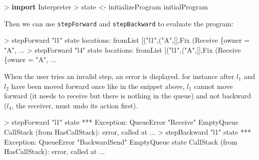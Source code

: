 \documentclass[runningheads,plain]{llncs}
\newenvironment{Shaded}{}{}
\newcommand{\KeywordTok}[1]{\textcolor[rgb]{0.00,0.44,0.13}{\textbf{#1}}}
\newcommand{\DataTypeTok}[1]{\textcolor[rgb]{0.56,0.13,0.00}{#1}}
\newcommand{\StringTok}[1]{\textcolor[rgb]{0.25,0.44,0.63}{#1}}
\newcommand{\OtherTok}[1]{\textcolor[rgb]{0.00,0.44,0.13}{#1}}
\newcommand{\FunctionTok}[1]{\textcolor[rgb]{0.02,0.16,0.49}{#1}}
\newcommand{\NormalTok}[1]{#1}
\begin{document}
\begin{Shaded}
\begin{Highlighting}[]
\FunctionTok{>} \KeywordTok{import }\DataTypeTok{Interpreter}
\FunctionTok{>}\NormalTok{ state }\OtherTok{<-}\NormalTok{ initializeProgram initialProgram}
\end{Highlighting}
\end{Shaded}

Then we can use \texttt{stepForward} and \texttt{stepBackward} to
evaluate the program:

\begin{Shaded}
\begin{Highlighting}[]
\FunctionTok{>}\NormalTok{ stepForward }\StringTok{"l1"}\NormalTok{ state}
\NormalTok{locations}\FunctionTok{:}\NormalTok{ fromList [(}\StringTok{"l1"}\NormalTok{,(}\StringTok{"A"}\NormalTok{,[],}\DataTypeTok{Fix}\NormalTok{ (}\DataTypeTok{Receive}\NormalTok{ \{owner }\FunctionTok{=} \StringTok{"A"}\NormalTok{, }\FunctionTok{...} 
\FunctionTok{>}\NormalTok{ stepForward }\StringTok{"l4"}\NormalTok{ state }
\NormalTok{locations}\FunctionTok{:}\NormalTok{ fromList [(}\StringTok{"l1"}\NormalTok{,(}\StringTok{"A"}\NormalTok{,[],}\DataTypeTok{Fix}\NormalTok{ (}\DataTypeTok{Receive}\NormalTok{ \{owner }\FunctionTok{=} \StringTok{"A"}\NormalTok{, }\FunctionTok{...} 
\end{Highlighting}
\end{Shaded}

When the user tries an invalid step, an error is displayed. for instance
after \(l_1\) and \(l_2\) have been moved forward once like in the
snippet above, \(l_1\) cannot move forward (it needs to receive but
there is nothing in the queue) and not backward (\(l_4\), the receiver,
must undo its action first).

\begin{Shaded}
\begin{Highlighting}[]
\FunctionTok{>}\NormalTok{ stepForward }\StringTok{"l1"}\NormalTok{ state}
\FunctionTok{***} \DataTypeTok{Exception}\FunctionTok{:} \DataTypeTok{QueueError} \StringTok{"Receive"} \DataTypeTok{EmptyQueue}
\DataTypeTok{CallStack}\NormalTok{ (from }\DataTypeTok{HasCallStack}\NormalTok{)}\FunctionTok{:}
\NormalTok{  error, called at }\FunctionTok{...} 
\FunctionTok{>}\NormalTok{ stepBackward }\StringTok{"l1"}\NormalTok{ state}
\FunctionTok{***} \DataTypeTok{Exception}\FunctionTok{:} \DataTypeTok{QueueError} \StringTok{"BackwardSend"} \DataTypeTok{EmptyQueue}\NormalTok{ state}
\DataTypeTok{CallStack}\NormalTok{ (from }\DataTypeTok{HasCallStack}\NormalTok{)}\FunctionTok{:}
\NormalTok{  error, called at }\FunctionTok{...} 
\end{Highlighting}
\end{Shaded}
\end{document}
